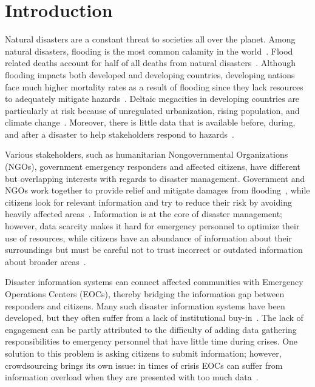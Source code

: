 \chapter{Introduction} Natural disasters are a constant threat to societies all
over the planet. Among natural disasters, flooding is the most common calamity
in the world~\cite{chanFloodRiskAsia2012}.  Flood related deaths account for
half of all deaths from natural disasters~\cite{ohlFloodingHumanHealth2000}.
Although flooding impacts both developed and developing countries, developing
nations face much higher mortality rates as a result of flooding since they lack
resources to adequately mitigate
hazards~\cite{quarantelliUrbanVulnerabilityDisasters2003,
ahernGlobalHealthImpacts2005}. Deltaic megacities in developing countries are
particularly at risk because of unregulated urbanization, rising population, and
climate change~\cite{chanFloodRiskAsia2012}.  Moreover, there is little data
that is available before, during, and after a disaster to help stakeholders
respond to hazards~\cite{meierDigitalHumanitariansHow2015}.

Various stakeholders, such as humanitarian Nongovernmental Organizations (NGOs),
government emergency responders and affected citizens, have different but
overlapping interests with regards to disaster management.  Government and NGOs
work together to provide relief and mitigate damages from
flooding~\cite{chanResilientFloodRisk2018}, while citizens
look for relevant information and try to reduce their
risk by avoiding heavily affected
areas~\cite{viewegMicrobloggingTwoNatural2010}. Information is at the core of
disaster management; however, data scarcity makes it hard for emergency
personnel to optimize their use of resources, while citizens have an abundance
of information about their surroundings but must be careful not to trust
incorrect or outdated information about broader
areas~\cite{quarantelliProblematicalAspectsInformation1997}.

Disaster information systems can connect affected communities with
Emergency Operations Centers (EOCs), thereby bridging the information gap
between responders and citizens. Many such disaster information systems have
been developed, but they often suffer from a lack of institutional
buy-in~\cite{aminDataNaturalDisasters2008}. The lack of engagement can be partly
attributed to the difficulty of adding data gathering responsibilities to
emergency personnel that have little time during crises. One solution to this
problem is asking citizens to submit information; however, crowdsourcing brings
its own issue: in times of crisis EOCs can suffer from information overload when
they are presented with too much
data~\cite{tierneyFacingUnexpectedDisaster2001}.

